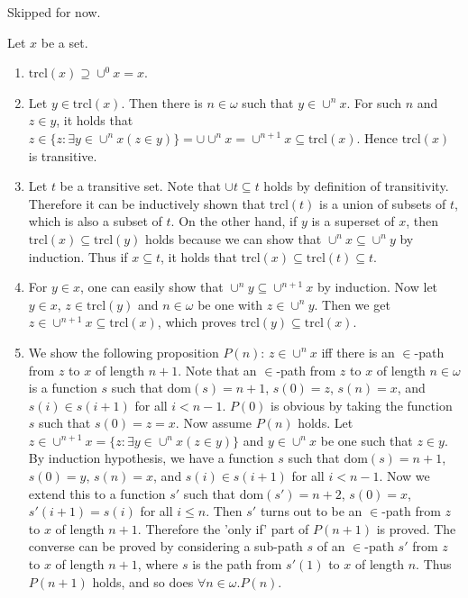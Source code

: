 \documentclass[12pt]{article}
\theoremstyle{definition}
\newenvironment{customthm}[1]
  {\renewcommand\theinnercustomthm{#1}\innercustomthm}
  {\endinnercustomthm}
\begin{document}
\begin{customthm}{I.8.23} Skipped for now.
\end{customthm}

\begin{customthm}{I.9.6} Let $x$ be a set.
  \begin{enumerate}
  \item $\mathrm{trcl}(x)\supseteq\cup^0x=x$.
  \item Let $y\in\mathrm{trcl}(x)$. Then there is $n\in\omega$ such that $y\in\cup^nx$. For such $n$ and $z\in y$, it holds that $z\in\{z:\exists y\in\cup^nx(z\in y)\}=\cup\cup^nx=\cup^{n+1}x\subseteq\mathrm{trcl}(x)$. Hence $\mathrm{trcl}(x)$ is transitive.
  \item Let $t$ be a transitive set. Note that $\cup t\subseteq t$ holds by definition of transitivity. Therefore it can be inductively shown that $\mathrm{trcl}(t)$ is a union of subsets of $t$, which is also a subset of $t$. On the other hand, if $y$ is a superset of $x$, then $\mathrm{trcl}(x)\subseteq\mathrm{trcl}(y)$ holds because we can show that $\cup^nx\subseteq\cup^ny$ by induction. Thus if $x\subseteq t$, it holds that $\mathrm{trcl}(x)\subseteq\mathrm{trcl}(t)\subseteq t$.
  \item For $y\in x$, one can easily show that $\cup^ny\subseteq\cup^{n+1}x$ by induction. Now let $y\in x$, $z\in\mathrm{trcl}(y)$ and $n\in\omega$ be one with $z\in\cup^ny$. Then we get $z\in\cup^{n+1}x\subseteq\mathrm{trcl}(x)$, which proves $\mathrm{trcl}(y)\subseteq\mathrm{trcl}(x)$.
  \item We show the following proposition $P(n)$: $z\in\cup^nx$ iff there is an $\in$-path from $z$ to $x$ of length $n+1$. Note that an $\in$-path from $z$ to $x$ of length $n\in\omega$ is a function $s$ such that $\mathrm{dom}(s)=n+1$, $s(0)=z$, $s(n)=x$, and $s(i)\in s(i+1)$ for all $i<n-1$.
  $P(0)$ is obvious by taking the function $s$ such that $s(0)=z=x$. Now assume $P(n)$ holds. Let $z\in\cup^{n+1}x=\{z:\exists y\in\cup^n x(z\in y)\}$ and $y\in\cup^n x$ be one such that $z\in y$. By induction hypothesis, we have a function $s$ such that $\mathrm{dom}(s)=n+1$, $s(0)=y$, $s(n)=x$, and $s(i)\in s(i+1)$ for all $i<n-1$.
  Now we extend this to a function $s'$ such that $\mathrm{dom}(s')=n+2$, $s(0)=x$, $s'(i+1)=s(i)$ for all $i\leq n$. Then $s'$ turns out to be an $\in$-path from $z$ to $x$ of length $n+1$. Therefore the 'only if' part of $P(n+1)$ is proved. The converse can be proved by considering a sub-path $s$ of an $\in$-path $s'$ from $z$ to $x$ of length $n+1$, where $s$ is the path from $s'(1)$ to $x$ of length $n$.
  Thus $P(n+1)$ holds, and so does $\forall n\in\omega.P(n)$.
  \end{enumerate}
\end{customthm}
\end{document}
